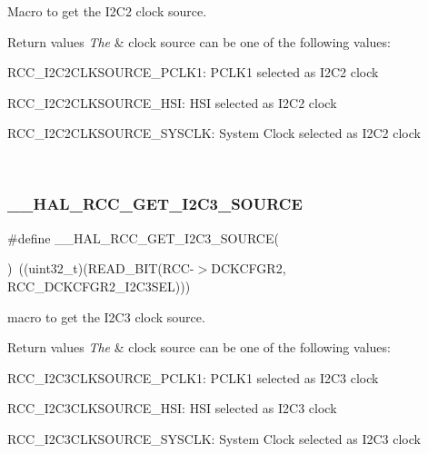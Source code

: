 Macro to get the I2\+C2 clock source. 


\begin{DoxyRetVals}{Return values}
{\em The} & clock source can be one of the following values\+: \begin{DoxyItemize}
\item R\+C\+C\+\_\+\+I2\+C2\+C\+L\+K\+S\+O\+U\+R\+C\+E\+\_\+\+P\+C\+L\+K1\+: P\+C\+L\+K1 selected as I2\+C2 clock \item R\+C\+C\+\_\+\+I2\+C2\+C\+L\+K\+S\+O\+U\+R\+C\+E\+\_\+\+H\+SI\+: H\+SI selected as I2\+C2 clock \item R\+C\+C\+\_\+\+I2\+C2\+C\+L\+K\+S\+O\+U\+R\+C\+E\+\_\+\+S\+Y\+S\+C\+LK\+: System Clock selected as I2\+C2 clock \end{DoxyItemize}
\\
\hline
\end{DoxyRetVals}
\mbox{\label{group___r_c_c_ex___exported___macros_gac1a897c77611227b305f8dde521c0d9e}} 
\subsubsection{\texorpdfstring{\_\_HAL\_RCC\_GET\_I2C3\_SOURCE}{\_\_HAL\_RCC\_GET\_I2C3\_SOURCE}}
{\footnotesize\ttfamily \#define \+\_\+\+\_\+\+H\+A\+L\+\_\+\+R\+C\+C\+\_\+\+G\+E\+T\+\_\+\+I2\+C3\+\_\+\+S\+O\+U\+R\+CE(\begin{DoxyParamCaption}{ }\end{DoxyParamCaption})~((uint32\+\_\+t)(R\+E\+A\+D\+\_\+\+B\+IT(R\+CC-\/$>$D\+C\+K\+C\+F\+G\+R2, R\+C\+C\+\_\+\+D\+C\+K\+C\+F\+G\+R2\+\_\+\+I2\+C3\+S\+EL)))}



macro to get the I2\+C3 clock source. 


\begin{DoxyRetVals}{Return values}
{\em The} & clock source can be one of the following values\+: \begin{DoxyItemize}
\item R\+C\+C\+\_\+\+I2\+C3\+C\+L\+K\+S\+O\+U\+R\+C\+E\+\_\+\+P\+C\+L\+K1\+: P\+C\+L\+K1 selected as I2\+C3 clock \item R\+C\+C\+\_\+\+I2\+C3\+C\+L\+K\+S\+O\+U\+R\+C\+E\+\_\+\+H\+SI\+: H\+SI selected as I2\+C3 clock \item R\+C\+C\+\_\+\+I2\+C3\+C\+L\+K\+S\+O\+U\+R\+C\+E\+\_\+\+S\+Y\+S\+C\+LK\+: System Clock selected as I2\+C3 clock \end{DoxyItemize}
\\
\hline
\end{DoxyRetVals}
\mbox{\label{group___r_c_c_ex___exported___macros_ga6632a1fbc809f6f6dedde0d36cbaa3c9}} 
